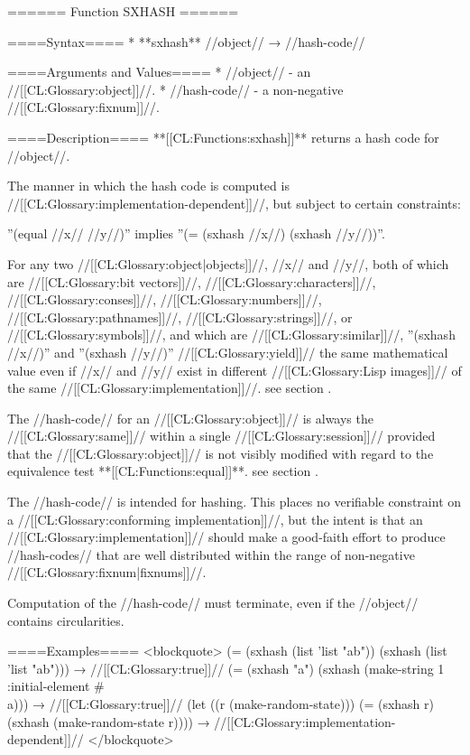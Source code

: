 ====== Function SXHASH ======

====Syntax====
  * **sxhash** //object// → //hash-code//

====Arguments and Values====
  * //object// - an //[[CL:Glossary:object]]//.
  * //hash-code// - a non-negative //[[CL:Glossary:fixnum]]//.

====Description====
**[[CL:Functions:sxhash]]** returns a hash code for //object//.

The manner in which the hash code is computed is //[[CL:Glossary:implementation-dependent]]//, but subject to certain constraints:

\beginlist {} ''(equal //x// //y//)'' implies ''(= (sxhash //x//) (sxhash //y//))''.

 For any two //[[CL:Glossary:object|objects]]//, //x// and //y//, both of which are //[[CL:Glossary:bit vectors]]//, //[[CL:Glossary:characters]]//, //[[CL:Glossary:conses]]//, //[[CL:Glossary:numbers]]//, //[[CL:Glossary:pathnames]]//, //[[CL:Glossary:strings]]//, or //[[CL:Glossary:symbols]]//, and which are //[[CL:Glossary:similar]]//, ''(sxhash //x//)'' and ''(sxhash //y//)'' //[[CL:Glossary:yield]]// the same mathematical value even if //x// and //y// exist in different //[[CL:Glossary:Lisp images]]// of the same //[[CL:Glossary:implementation]]//. see section {\secref\LiteralsInCompiledFiles}.

 The //hash-code// for an //[[CL:Glossary:object]]// is always the //[[CL:Glossary:same]]// within a single //[[CL:Glossary:session]]// provided that the //[[CL:Glossary:object]]// is not visibly modified with regard to the equivalence test **[[CL:Functions:equal]]**. see section {\secref\ModifyingHashKeys}.

 The //hash-code// is intended for hashing. This places no verifiable constraint on a //[[CL:Glossary:conforming implementation]]//, but the intent is that an //[[CL:Glossary:implementation]]// should make a good-faith effort to produce //hash-codes// that are well distributed within the range of non-negative //[[CL:Glossary:fixnum|fixnums]]//.

 Computation of the //hash-code// must terminate, even if the //object// contains circularities. \endlist

====Examples====
<blockquote> (= (sxhash (list 'list "ab")) (sxhash (list 'list "ab"))) → //[[CL:Glossary:true]]// (= (sxhash "a") (sxhash (make-string 1 :initial-element #\\a))) → //[[CL:Glossary:true]]// (let ((r (make-random-state))) (= (sxhash r) (sxhash (make-random-state r)))) → //[[CL:Glossary:implementation-dependent]]// </blockquote>

